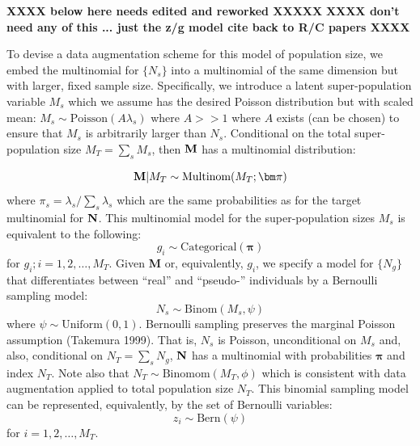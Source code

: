 {\bf XXXX below here needs edited and reworked XXXXX}
{\bf XXXX don't need any of this ... just the z/g model cite back to
  R/C papers XXXX}



To devise a data augmentation scheme for this model of population
size, we embed the multinomial for $\{ N_{s} \}$ into a multinomial of
the same dimension but with larger, fixed sample size.  Specifically,
we introduce a latent super-population variable $M_{s}$ which we
assume has the desired Poisson distribution but with scaled mean:
$M_{s} \sim \mbox{Poisson}(A \lambda_{s})$ where $A>>1$ where $A$
exists (can be chosen) to ensure that $M_{s}$ is arbitrarily larger
than $N_{s}$.  Conditional on the total super-population size $M_{T} =
\sum_{s} M_{s}$, then ${\bf M}$ has a multinomial distribution:

\begin{equation}
{\bf M}|M_{T} \sim \mbox{Multinom}(M_{T};  {\bm \pi} ) 
\label{eq.mn1}
\end{equation}
where $\pi_{s} = \lambda_{s}/\sum_{s} \lambda_{s}$ which are the same
probabilities as for the target multinomial for ${\bf N}$. 
This multinomial model for the super-population sizes $M_{s}$ is
equivalent to the following:
\[
 g_{i} \sim \mbox{Categorical}({\bm \pi} )
\]
for $g_{i}; i=1,2,\ldots, M_{T}$.  Given {\bf M} or, equivalently,
$g_{i}$, we specify a model for $\{ N_{g}\}$ that differentiates
between ``real'' and ``pseudo-'' individuals by a Bernoulli sampling
model:
\[
 N_{s} \sim \mbox{Binom}(M_{s} , \psi)
\]
where $\psi \sim \mbox{Uniform}(0,1)$. Bernoulli sampling preserves the
marginal Poisson assumption (Takemura 1999). That is, $N_{s}$ is
Poisson, unconditional on $M_{s}$ and, also, 
conditional on $N_{T} = \sum_{s} N_{g}$, ${\bf N}$ has a multinomial
with probabilities ${\bm \pi}$ and index $N_{T}$.  Note also that
$N_{T} \sim \mbox{Binomom}(M_{T}, \phi)$ which is consistent with data
augmentation applied to total population size $N_{T}$. This binomial
sampling model can be represented, equivalently, by the set of
Bernoulli variables:
\[
 z_{i} \sim \mbox{Bern}(\psi)
\]
for $i=1,2,\ldots,M_{T}$.


